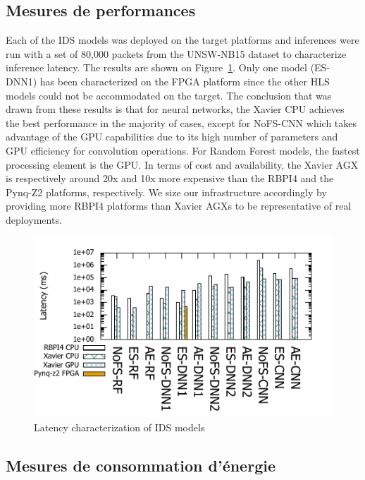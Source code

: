 \subsection{Mesures de performances}

Each of the IDS models was deployed on the target platforms and inferences were run with a set of 80,000 packets from the UNSW-NB15 dataset to characterize inference latency. The results are shown on Figure~\ref{figure:herocache-performance}. Only one model (ES-DNN1) has been characterized on the FPGA platform since the other HLS models could not be accommodated on the target. %
The conclusion that was drawn from these results is that for neural networks, the Xavier CPU achieves the best performance in the majority of cases, except for NoFS-CNN which takes advantage of the GPU capabilities due to its high number of parameters and GPU efficiency for convolution operations. For Random Forest models, the fastest processing element is the GPU. In terms of cost and availability, the Xavier AGX is respectively around 20x and 10x more expensive than the RBPI4 and the Pynq-Z2 platforms, respectively. We size our infrastructure accordingly by providing more RBPI4 platforms than Xavier AGXs to be  representative of real deployments. %

\begin{figure}
    \centering
    \includegraphics[width=0.9\columnwidth]{6_Chapitre4/figures/latency_bar.pdf}
    \caption{Latency characterization of IDS models}
    \label{figure:herocache-performance}
\end{figure}

\subsection{Mesures de consommation d'énergie}

